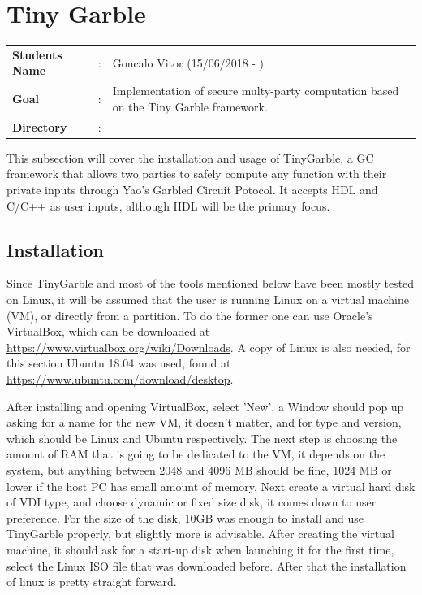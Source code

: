 \clearpage
\section{Tiny Garble}

\begin{refsection}

\begin{tcolorbox}	
\begin{tabular}{p{2.75cm} p{0.2cm} p{10.5cm}} 	
\textbf{Students Name}      &:& Goncalo Vitor (15/06/2018 - )\\
\textbf{Goal}               &:& Implementation of secure multy-party computation based on the Tiny Garble framework.\\
\textbf{Directory}          &:& \\
\end{tabular}
\end{tcolorbox}



This subsection will cover the installation and usage of TinyGarble, a GC framework that allows two parties to safely compute any function with their private inputs through Yao's Garbled Circuit Potocol. It accepts HDL and C/C++ as user inputs, although HDL will be the primary focus.

\subsection{Installation}

Since TinyGarble and most of the tools mentioned below have been mostly tested on Linux, it will be assumed that the user is running Linux on a virtual machine (VM), or directly from a partition. To do the former one can use Oracle's VirtualBox, which can be downloaded at \url{https://www.virtualbox.org/wiki/Downloads}. A copy of Linux is also needed, for this section Ubuntu 18.04 was used, found at \url{https://www.ubuntu.com/download/desktop}.

After installing and opening VirtualBox, select 'New', a Window should pop up asking for a name for the new VM, it doesn't matter, and for type and version, which should be Linux and Ubuntu respectively. The next step is choosing the amount of RAM that is going to be dedicated to the VM,  it depends on the system, but anything between 2048 and 4096 MB should be fine, 1024 MB or lower if the host PC has small amount of memory. Next create a virtual hard disk of VDI type, and choose dynamic or fixed size disk, it comes down to user preference. For the size of the disk, 10GB was enough to install and use TinyGarble properly, but slightly more is advisable.
After creating the virtual machine, it should ask for a start-up disk when launching it for the first time, select the Linux ISO file that was downloaded before. After that the installation of linux is pretty straight forward.


\end{refsection}

